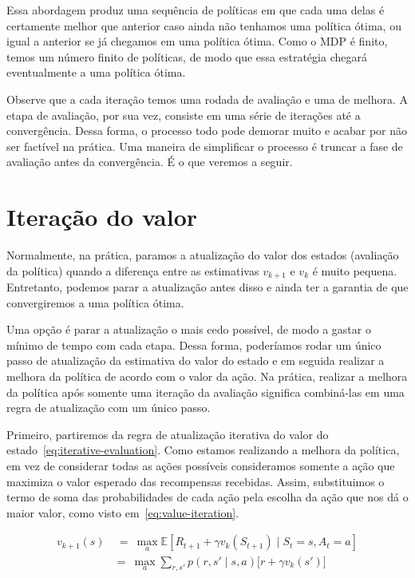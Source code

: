 \documentclass{article}
\begin{document}
        Essa abordagem produz uma sequência de políticas em que cada uma delas é certamente melhor que anterior caso ainda não tenhamos uma política ótima, ou igual a anterior se já chegamos em uma política ótima. Como o MDP é finito, temos um número finito de políticas, de modo que essa estratégia chegará eventualmente a uma política ótima.
        
        Observe que a cada iteração temos uma rodada de avaliação e uma de melhora. A etapa de avaliação, por sua vez, consiste em uma série de iterações até a convergência. Dessa forma, o processo todo pode demorar muito e acabar por não ser factível na prática. Uma maneira de simplificar o processo é truncar a fase de avaliação antes da convergência. É o que veremos a seguir.

    \section{Iteração do valor}

        Normalmente, na prática, paramos a atualização do valor dos estados (avaliação da política) quando a diferença entre as estimativas $v_{k+1}$ e $v_k$ é muito pequena. Entretanto, podemos parar a atualização antes disso e ainda ter a garantia de que convergiremos a uma política ótima.

        Uma opção é parar a atualização o mais cedo possível, de modo a gastar o mínimo de tempo com cada etapa. Dessa forma, poderíamos rodar um único passo de atualização da estimativa do valor do estado e em seguida realizar a melhora da política de acordo com o valor da ação. Na prática, realizar a melhora da política após somente uma iteração da avaliação significa combiná-las em uma regra de atualização com um único passo.

        Primeiro, partiremos da regra de atualização iterativa do valor do estado~\eqref{eq:iterative-evaluation}. Como estamos realizando a melhora da política, em vez de considerar todas as ações possíveis consideramos somente a ação que maximiza o valor esperado das recompensas recebidas. Assim, substituimos o termo de soma das probabilidades de cada ação pela escolha da ação que nos dá o maior valor, como visto em~\eqref{eq:value-iteration}.
        
        \begin{equation}
            \begin{aligned}
                v_{k+1}(s) & \ = \ \max_a \mathbb{E}[R_{t+1} + \gamma v_k(S_{t+1}) \mid S_t = s, A_t = a] \\
                & = \ \max_a \sum_{r, s'} p(r, s' \mid s, a) \Big[ r + \gamma v_k(s') \Big]
            \end{aligned}
            \label{eq:value-iteration}
        \end{equation}
        
\end{document}
